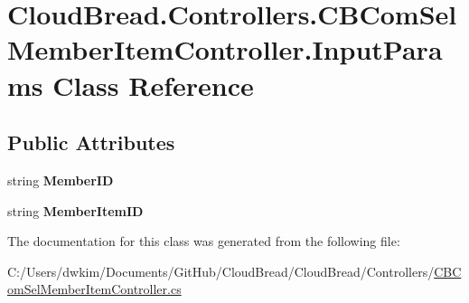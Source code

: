 \hypertarget{a00121}{}\section{Cloud\+Bread.\+Controllers.\+C\+B\+Com\+Sel\+Member\+Item\+Controller.\+Input\+Params Class Reference}
\label{a00121}
\subsection*{Public Attributes}
\begin{DoxyCompactItemize}
\item 
string {\bfseries Member\+ID}\hypertarget{a00121_a49461f3a84e674cf50d09ec56c3d4d68}{}\label{a00121_a49461f3a84e674cf50d09ec56c3d4d68}

\item 
string {\bfseries Member\+Item\+ID}\hypertarget{a00121_a95001064eb84f90b33510cdaf2ca068a}{}\label{a00121_a95001064eb84f90b33510cdaf2ca068a}

\end{DoxyCompactItemize}


The documentation for this class was generated from the following file\+:\begin{DoxyCompactItemize}
\item 
C\+:/\+Users/dwkim/\+Documents/\+Git\+Hub/\+Cloud\+Bread/\+Cloud\+Bread/\+Controllers/\hyperlink{a00205}{C\+B\+Com\+Sel\+Member\+Item\+Controller.\+cs}\end{DoxyCompactItemize}
